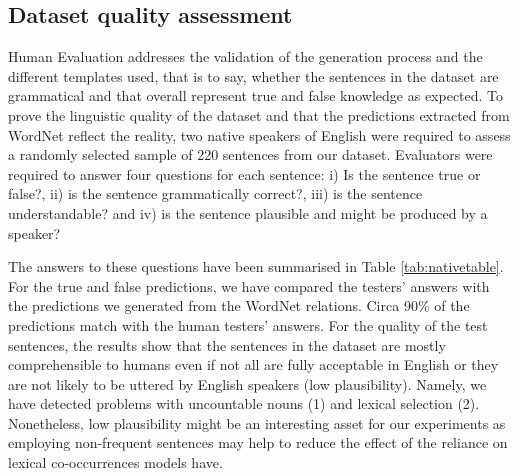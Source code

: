 \documentclass[11pt]{article}
\newcommand{\WORDNET}{WordNet}
\begin{document}
\subsection{Dataset quality assessment} \label{sec:dataquality}
Human Evaluation addresses the validation of the generation process and the different templates used, that is to say, whether the sentences in the dataset are grammatical and that overall represent true and false knowledge as expected. To prove the linguistic quality of the dataset and that the predictions extracted from \WORDNET{} reflect the reality, two native speakers of English were required to assess a randomly selected sample of 220 sentences from our dataset. Evaluators were required to answer four questions for each sentence: i) Is the sentence true or false?, ii) is the sentence grammatically correct?, iii) is the sentence understandable? and iv) is the sentence plausible and might be produced by a speaker?




\begin{table}[tb]
\caption{Human evaluation of the quality of the sentences in the dataset.}
\label{tab:nativetable}
\end{table}
 

The answers to these questions have been summarised in Table \ref{tab:nativetable}. For the true and false predictions, we have compared the testers' answers with the predictions we generated from the \WORDNET{} relations. Circa 90\% of the predictions match with the human testers' answers.  For the quality of the test sentences, the results show that the sentences in the dataset are mostly comprehensible to humans even if not all are fully acceptable in English or they are not likely to be uttered by English speakers (low plausibility). Namely, we have detected problems with uncountable nouns (1) and lexical selection (2). Nonetheless, low plausibility might be an interesting asset for our experiments as employing non-frequent sentences may help to reduce the effect of the reliance on lexical co-occurrences models have.
\end{document}
